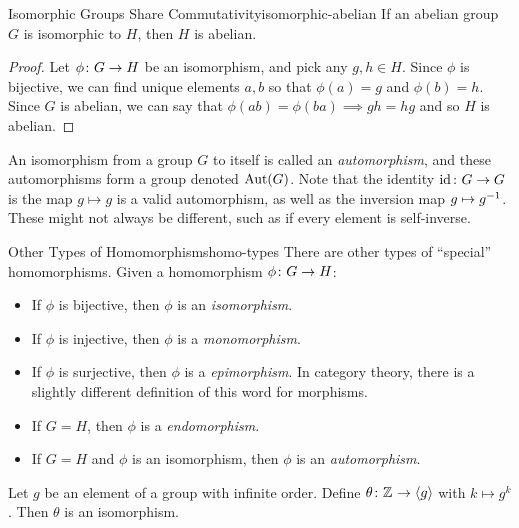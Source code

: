 \documentclass{article}
\begin{document}
\begin{theorem}{Isomorphic Groups Share Commutativity}{isomorphic-abelian}
  If an abelian group $G$ is isomorphic to $H$, then $H$ is abelian.
\end{theorem}
\begin{proof}
  Let $\phi \colon G \to H$ be an isomorphism, and pick any $g, h \in H$.
  Since $\phi$ is bijective, we can find unique elements $a, b$ so that
  $\phi(a) = g$ and $\phi(b) = h$. Since $G$ is abelian, we can say that
  $\phi(ab) = \phi(ba) \implies gh = hg$ and so $H$ is abelian.
\end{proof}

\begin{remark}
  An isomorphism from a group $G$ to itself is called an \emph{automorphism},
  and these automorphisms form a group denoted $\operatorname{Aut}(G)$.
  Note that the identity $\mathrm{id}_{} \colon G \to G$ is the map $g \mapsto g$ is a valid automorphism,
  as well as the inversion map $g \mapsto g^{-1}$. These might not always be different,
  such as if every element is self-inverse.
\end{remark}

\begin{definition}{Other Types of Homomorphisms}{homo-types}
  There are other types of ``special'' homomorphisms.
  Given a homomorphism $\phi \colon G \to H$:
  \begin{itemize}
    \item If $\phi$ is bijective, then $\phi$ is an \emph{isomorphism}.
    \item If $\phi$ is injective, then $\phi$ is a \emph{monomorphism}.
    \item If $\phi$ is surjective, then $\phi$ is a \emph{epimorphism}.
          In category theory, there is a slightly different definition
          of this word for morphisms.
    \item If $G = H$, then $\phi$ is a \emph{endomorphism}.
    \item If $G = H$ and $\phi$ is an isomorphism, then $\phi$
          is an \emph{automorphism}.
  \end{itemize}

\end{definition}


\begin{theorem}{}{}
  Let $g$ be an element of a group with infinite order.
  Define $\theta \colon \mathbb{Z}^{} \to \langle g\rangle$ with $k \mapsto g^{k}$. Then $\theta$ is an isomorphism.
\end{theorem}
\end{document}
